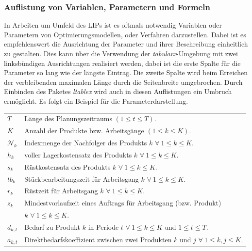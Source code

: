 \documentclass[13pt,a4paper, listof=entryprefix, bibliography=totocnumbered,toc=listofnumbered,lof=listofnumbered]{scrartcl}
\begin{document}
\subsubsection{Auflistung von Variablen, Parametern und Formeln}
\label{ch:parameter}
In Arbeiten um Umfeld des LIPs ist es oftmals notwendig Variablen oder Parametern von Optimierungsmodellen, oder Verfahren darzustellen. Dabei ist es empfehlenswert die Ausrichtung der Parameter und ihrer Beschreibung einheitlich zu gestalten. Dies kann über die Verwendung der \textit{tabularx}-Umgebung mit zwei linksbündigen Ausrichtungen realisiert werden, dabei ist die erste Spalte für die Parameter so lang wie der längste Eintrag. Die zweite Spalte wird beim Erreichen der verbleibenden maximalen Länge durch die Seitenbreite umgebrochen. Durch Einbinden des Paketes \textit{ltablex} wird auch in diesen Auflistungen ein Umbruch ermöglicht. Es folgt ein Beispiel für die Parameterdarstellung.
\begin{tabularx}{\linewidth}{@{}p{1 cm}X}  %
	$T$               & Länge des Planungszeitraums $(1 \le t \le T)$.                                            \\
	$K$               & Anzahl der Produkte bzw. Arbeitsgänge $(1 \le k \le K)$.                                  \\
	$\mathcal{N}_{k}$ & Indexmenge der Nachfolger des Produkts $k$ $\forall~ 1 \le k \le K$.                      \\
	$h_k$             & voller Lagerkostensatz des Produkts $k$ $\forall~ 1 \le k \le K$.                         \\
	$s_k$             & Rüstkostensatz des Produkts $k$ $\forall~ 1 \le k \le K$.                                 \\
	$tb_k$            & Stückbearbeitungszeit für Arbeitsgang $k$ $\forall~ 1 \le k \le K$.                       \\
	$r_k$             & Rüstzeit für Arbeitsgang $k$ $\forall~ 1 \le k \le K$.                                    \\
	$z_k$             & Mindestvorlaufzeit eines Auftrags für Arbeitsgang (bzw. Produkt)                          \\
	                  & $k$ $\forall~ 1 \le k \le K$.                                                             \\
	$d_{k,t}$         & Bedarf zu Produkt $k$ in Periode $t$ $\forall~ 1 \le k \le K \text{ und } 1 \le t \le T$. \\
	$a_{k,t}$         & Direktbedarfskoeffizient zwischen zwei Produkten $k$ und $j$ $\forall~ 1 \le k, j \le K$. \\
\end{tabularx}
\end{document}
